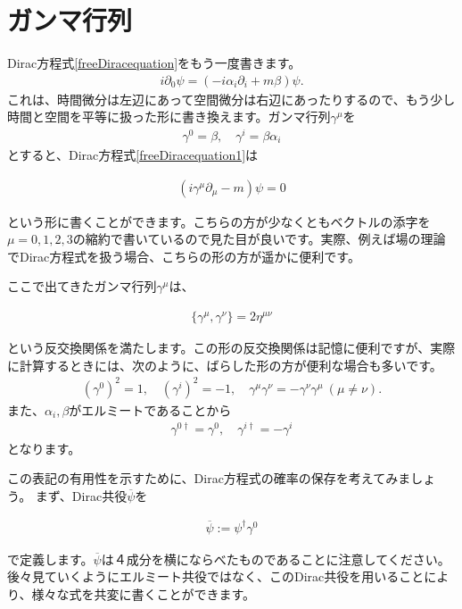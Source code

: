 \documentclass[report,paper=a4, fontsize=12pt, line_length=16cm, number_of_lines=33,dvipdfmx]{jlreq}
\newenvironment{important}{\begin{tcolorbox}[
  colback = white,
  colframe = red!35,
  boxrule = 2mm,
  fonttitle = \bfseries,
  after = \noindent] }{\end{tcolorbox}}
\numberwithin{equation}{chapter}
\newcommand{\del}{\partial}
\newcommand{\psib}{\overline{\psi}}
\begin{document}
\section{ガンマ行列}
Dirac方程式\eqref{freeDiracequation}をもう一度書きます。
\begin{align}
  i\del_{0}\psi=(-i\alpha_i\del_{i}+m\beta)\psi.
  \label{freeDiracequation1}
\end{align}
これは、時間微分は左辺にあって空間微分は右辺にあったりするので、もう少し時間と空間を平等に扱った形に書き換えます。ガンマ行列$\gamma^{\mu}$を
\begin{align}
  \gamma^{0}=\beta,\quad \gamma^{i}=\beta\alpha_i
\end{align}
とすると、Dirac方程式\eqref{freeDiracequation1}は
\begin{important}
  \begin{align}
    (i\gamma^{\mu}\del_{\mu}-m)\psi=0 \label{freeDiracequation2}
  \end{align}
\end{important}
という形に書くことができます。こちらの方が少なくともベクトルの添字を$\mu=0,1,2,3$の縮約で書いているので見た目が良いです。実際、例えば場の理論でDirac方程式を扱う場合、こちらの形の方が遥かに便利です。

ここで出てきたガンマ行列$\gamma^{\mu}$は、
\begin{important}
  \begin{align}
    \{\gamma^{\mu},\gamma^{\nu}\}=2\eta^{\mu\nu}\label{gammaanticommutationrelation}
  \end{align}    
\end{important}
という反交換関係を満たします。この形の反交換関係は記憶に便利ですが、実際に計算するときには、次のように、ばらした形の方が便利な場合も多いです。
\begin{align}
  (\gamma^{0})^2=1,\quad (\gamma^{i})^2=-1,\quad
  \gamma^{\mu}\gamma^{\nu}=-\gamma^{\nu}\gamma^{\mu}\ (\mu\ne \nu).
  \label{gammaanticommutationrelation1}
\end{align}
また、$\alpha_i,\beta$がエルミートであることから
\begin{align}
  \gamma^{0\dag}=\gamma^{0},\quad \gamma^{i\dag}=-\gamma^{i}
  \label{gammahermiticity}
\end{align}
となります。

この表記の有用性を示すために、Dirac方程式の確率の保存を考えてみましょう。
まず、Dirac共役$\psib$を
\begin{important}
  \begin{align}
    \psib:=\psi^{\dag}\gamma^{0}
  \end{align}  
\end{important}
で定義します。$\psib$は４成分を横にならべたものであることに注意してください。後々見ていくようにエルミート共役ではなく、このDirac共役を用いることにより、様々な式を共変に書くことができます。
\end{document}
